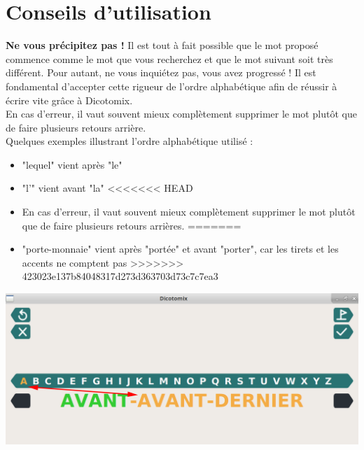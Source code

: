 \documentclass[french]{article}
\begin{document}
\section*{Conseils d'utilisation}
\textbf{Ne vous précipitez pas !} Il est tout à fait possible que le mot proposé commence comme le mot que vous recherchez et que le mot suivant soit très différent. Pour autant, ne vous inquiétez pas, vous avez progressé ! Il est fondamental d'accepter cette rigueur de l'ordre alphabétique afin de réussir à écrire vite grâce à Dicotomix.
\\
En cas d'erreur, il vaut souvent mieux complètement supprimer le mot plutôt que de faire plusieurs retours arrière.
\\
Quelques exemples illustrant l'ordre alphabétique utilisé :
\begin{itemize}
	\item "lequel" vient après "le"
	\item "l'" vient avant "la"
<<<<<<< HEAD
	\item En cas d'erreur, il vaut souvent mieux complètement supprimer le mot plutôt que de faire plusieurs retours arrières.
=======
	\item "porte-monnaie" vient après "portée" et avant "porter", car les tirets et les accents ne comptent pas
>>>>>>> 423023e137b84048317d273d363703d73c7c7ea3
\end{itemize}

\begin{center}
	\includegraphics[scale=0.22]{tiret}
\end{center}
\end{document}

